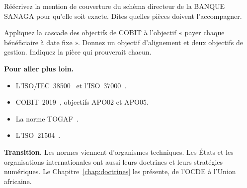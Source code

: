 \begin{boxexo}[title={\ding{45}\quad Exercice~4.3. La couverture \niveaumoyen}]
Réécrivez la mention de couverture du schéma directeur de la BANQUE SANAGA pour qu'elle soit exacte. Dites quelles pièces doivent l'accompagner.
\end{boxexo}

\begin{boxexo}[title={\ding{45}\quad Exercice~4.4. Cascade \niveauexpert}]
Appliquez la cascade des objectifs de COBIT à l'objectif « payer chaque bénéficiaire à date fixe ». Donnez un objectif d'alignement et deux objectifs de gestion. Indiquez la pièce qui prouverait chacun.
\end{boxexo}

\bigskip

\begin{boxinfo}
\textbf{Pour aller plus loin.}
\begin{itemize}
    \item L'ISO/IEC~38500~\cite{iso38500} et l'ISO~37000~\cite{iso37000}.
    \item COBIT~2019~\cite{cobit2019}, objectifs APO02 et APO05.
    \item La norme TOGAF~\cite{togaf10}.
    \item L'ISO~21504~\cite{iso21504}.
\end{itemize}
\end{boxinfo}

\begin{boxinfo}
\textbf{Transition.} Les normes viennent d'organismes techniques. Les États et les organisations internationales ont aussi leurs doctrines et leurs stratégies numériques. Le Chapitre~\ref{chap:doctrines} les présente, de l'OCDE à l'Union africaine.
\end{boxinfo}
